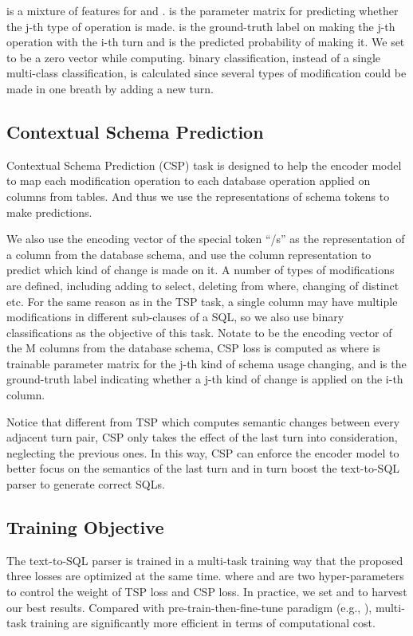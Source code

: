 \documentclass[a4paper]{article}
\begin{document}
 is a mixture of features for  and .  is the parameter matrix for predicting whether the j-th type of operation is made.  is the ground-truth label on making the j-th operation with the i-th turn and  is the predicted probability of making it. We set  to be a zero vector while computing.  binary classification, instead of a single multi-class classification, is calculated since several types of modification could be made in one breath by adding a new turn.

\subsection{Contextual Schema Prediction}

Contextual Schema Prediction (CSP) task is designed to help the encoder model to map each modification operation to each database operation applied on columns from tables. And thus we use the representations of schema tokens to make predictions.

We also use the encoding vector of the special token ``/s'' as the representation of a column from the database schema, and use the column representation to predict which kind of change is made on it. A number of  types of modifications are defined, including adding to select, deleting from where, changing of distinct etc. For the same reason as in the TSP task, a single column may have multiple modifications in different sub-clauses of a SQL, so we also use  binary classifications as the objective of this task. Notate  to be the encoding vector of the M columns from the database schema, CSP loss is computed as
 where  is trainable parameter matrix for the j-th kind of schema usage changing, and  is the ground-truth label indicating whether a j-th kind of change is applied on the i-th column.

Notice that different from TSP which computes semantic changes between every adjacent turn pair, CSP only takes the effect of the last turn into consideration, neglecting the previous ones. In this way, CSP can enforce the encoder model to better focus on the semantics of the last turn and in turn boost the text-to-SQL parser to generate correct SQLs.

\subsection{Training Objective}

The text-to-SQL parser is trained in a multi-task training way that the proposed three losses are optimized at the same time.
 where  and  are two hyper-parameters to control the weight of TSP loss and CSP loss. In practice, we set  and  to harvest our best results. Compared with pre-train-then-fine-tune paradigm (e.g., \cite{yu2020score}), multi-task training are significantly more efficient in terms of computational cost.
\end{document}
